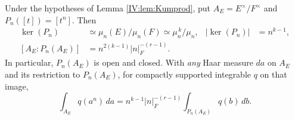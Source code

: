 \begin{proposition}\label{IV:prop:power-etale}
Under the hypotheses of Lemma \ref{IV:lem:Kumprod}, put
$A_E=E^\times/F^\times$ and $P_n([t])=[t^n]$.  Then
\begin{align}
 \ker(P_n)&\simeq \mu_n(E)/\mu_n(F)
      \simeq \mu_n^{\,k}/\mu_n,
 &|\ker(P_n)|&=n^{k-1},\label{IV:eq:kernel}\\
 [A_E:P_n(A_E)]&=n^{2(k-1)}|n|_F^{-(r-1)}.
 \label{IV:eq:index}
\end{align}
In particular, $P_n(A_E)$ is open and closed.  With \emph{any}
Haar measure $da$ on $A_E$ and its restriction to $P_n(A_E)$,
for compactly supported integrable $q$ on that image,
\begin{equation}\label{IV:eq:haarJac}
 \int_{A_E}q(a^n)\,da
 =n^{k-1}|n|_F^{-(r-1)}
   \int_{P_n(A_E)}q(b)\,db.
\end{equation}
\end{proposition}
